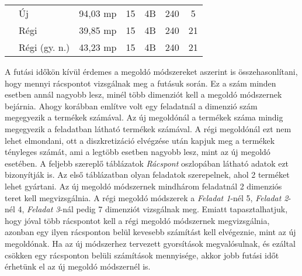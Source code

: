 \begin{table}[H]
\begin{center}
\begin{tabular}{|l|l|c|c|c|c|c|}
                                                 & Új                              & 94,03 mp    & 15           & 4B                & 240    & 5                             \\ \cline{2-7} 
                                                 & Régi                            & 39,85 mp    & 15           & 4B                & 240    & 21                            \\ \cline{2-7} 
                                                 & Régi (gy. n.)                   & 43,23 mp    & 15           & 4B                & 240    & 21                            \\ \hline
\end{tabular}
\end{center}
\end{table}

\newpage
A futási időkön kívül érdemes a megoldó módszereket aszerint is összehasonlítani, hogy mennyi rácspontot vizsgálnak meg a futásuk során.
Ez a szám minden esetben annál nagyobb lesz, minél több dimenziót kell a megoldó módszernek bejárnia.
Ahogy korábban említve volt egy feladatnál a dimenzió szám megegyezik a termékek számával.
Az új megoldónál a termékek száma mindig megegyezik a feladatban látható termékek számával.
A régi megoldónál ezt nem lehet elmondani, ott a diszkretizáció elvégzése után kapjuk meg a termékek tényleges számát, ami a legtöbb esetben nagyobb lesz, mint az új megoldó esetében.
A feljebb szereplő táblázatok \textit{Rácspont} oszlopában látható adatok ezt bizonyítják is.
Az első táblázatban olyan feladatok szerepelnek, ahol 2 terméket lehet gyártani.
Az új megoldó módszernek mindhárom feladatnál 2 dimenziós teret kell megvizsgálnia.
A régi megoldó módszerek a \textit{Feladat 1}-nél 5, \textit{Feladat 2}-nél 4, \textit{Feladat 3}-nál pedig 7 dimenziót vizsgálnak meg.
Emiatt tapasztalhatjuk, hogy jóval több rácspontot kell a régi megoldó módszernek megvizsgálnia, azonban egy ilyen rácsponton belül kevesebb számítást kell elvégeznie, mint az új megoldónak.
Ha az új módszerhez tervezett gyorsítások megvalósulnak, és ezáltal csökken egy rácsponton belüli számítások mennyisége, akkor jobb futási időt érhetünk el az új megoldó módszernél is.